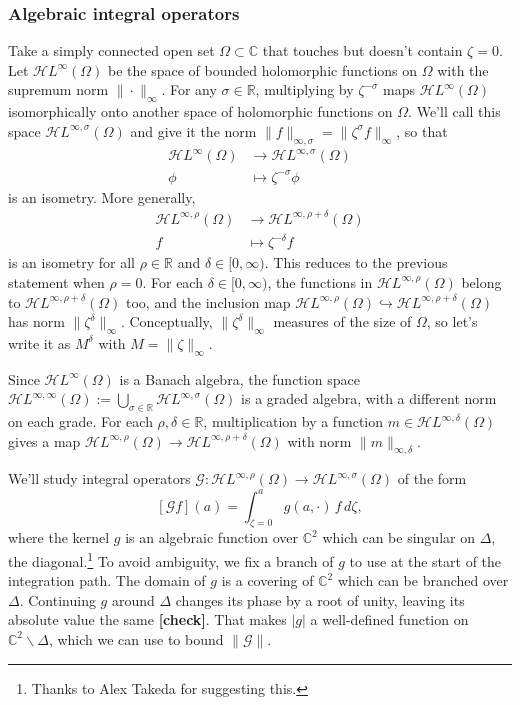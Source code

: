 \documentclass{article}
\theoremstyle{plain}
\newcommand{\maps}{\colon}
\newcommand{\R}{\mathbb{R}}
\newcommand{\C}{\mathbb{C}}
\newcommand{\holoL}[1]{\mathcal{H}L^{#1}} %
\begin{document}
\subsubsection{Algebraic integral operators}
Take a simply connected open set $\Omega \subset \C$ that touches but doesn't contain $\zeta = 0$. Let $\holoL{\infty}(\Omega)$ be the space of bounded holomorphic functions on $\Omega$ with the supremum norm $\|\cdot\|_\infty$. For any $\sigma \in \R$, multiplying by $\zeta^{-\sigma}$ maps $\holoL{\infty}(\Omega)$ isomorphically onto another space of holomorphic functions on $\Omega$. We'll call this space $\holoL{\infty, \sigma}(\Omega)$ and give it the norm $\|f\|_{\infty, \sigma} = \|\zeta^\sigma f\|_\infty$, so that
\begin{align*}
\holoL{\infty}(\Omega) & \to \holoL{\infty, \sigma}(\Omega) \\
\phi & \mapsto \zeta^{-\sigma} \phi
\end{align*}
is an isometry. More generally,
\begin{align*}
\holoL{\infty, \rho}(\Omega) & \to \holoL{\infty, \rho+\delta}(\Omega) \\
f & \mapsto \zeta^{-\delta} f
\end{align*}
is an isometry for all $\rho \in \R$ and $\delta \in [0, \infty)$. This reduces to the previous statement when $\rho = 0$. For each $\delta \in [0, \infty)$, the functions in $\holoL{\infty, \rho}(\Omega)$ belong to $\holoL{\infty, \rho+\delta}(\Omega)$ too, and the inclusion map $\holoL{\infty, \rho}(\Omega) \hookrightarrow \holoL{\infty, \rho+\delta}(\Omega)$ has norm $\|\zeta^\delta\|_\infty$. Conceptually, $\|\zeta^\delta\|_\infty$ measures of the size of $\Omega$, so let's write it as $M^\delta$ with $M = \|\zeta\|_\infty$.

Since $\holoL{\infty}(\Omega)$ is a Banach algebra, the function space $\holoL{\infty, \infty}(\Omega) := \bigcup_{\sigma \in \R} \holoL{\infty, \sigma}(\Omega)$ is a graded algebra, with a different norm on each grade. For each $\rho, \delta \in \R$, multiplication by a function $m \in \holoL{\infty, \delta}(\Omega)$ gives a map $\holoL{\infty, \rho}(\Omega) \to \holoL{\infty, \rho+\delta}(\Omega)$ with norm $\|m\|_{\infty, \delta}$.

We'll study integral operators $\mathcal{G} \maps \holoL{\infty, \rho}(\Omega) \to \holoL{\infty, \sigma}(\Omega)$ of the form
\[ [\mathcal{G}f](a) = \int_{\zeta = 0}^{a} g(a, \cdot)\,f\,d\zeta, \]
where the kernel $g$ is an algebraic function over $\C^2$ which can be singular on $\Delta$, the diagonal.\footnote{Thanks to Alex Takeda for suggesting this.} To avoid ambiguity, we fix a branch of $g$ to use at the start of the integration path. The domain of $g$ is a covering of $\C^2$ which can be branched over $\Delta$. Continuing $g$ around $\Delta$ changes its phase by a root of unity, leaving its absolute value the same \textbf{[check]}. That makes $|g|$ a well-defined function on $\C^2 \smallsetminus \Delta$, which we can use to bound $\|\mathcal{G}\|$.
\end{document}
